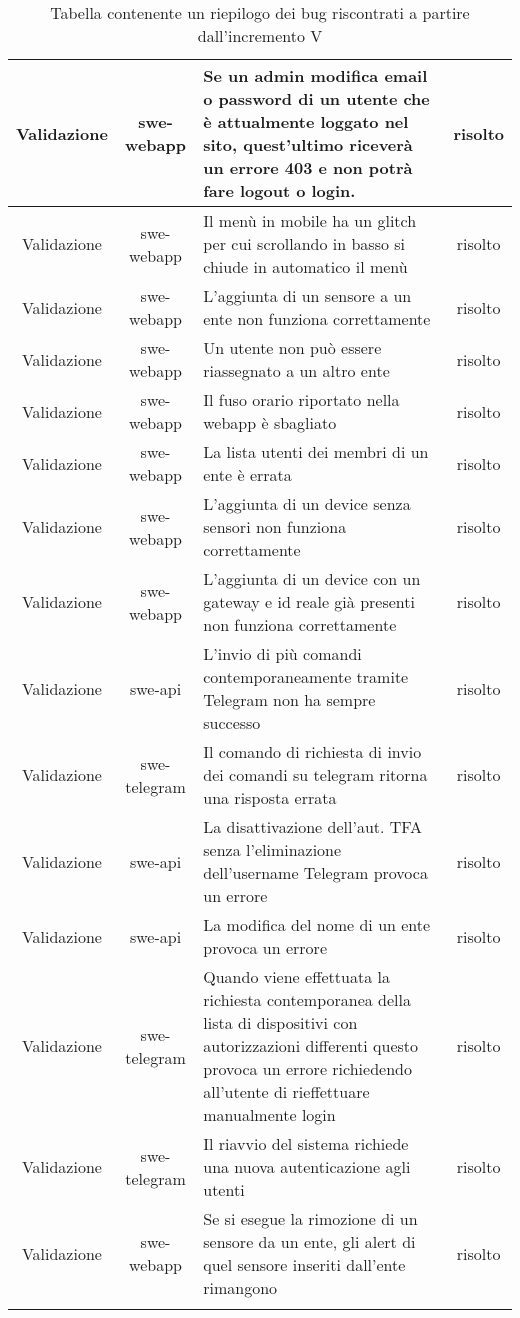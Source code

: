 \begin{center}
\begin{longtable}{|c|c|p{9.5cm}|c|}
    \hline
    Validazione & swe-webapp & Se un admin modifica email o password di un utente che è attualmente loggato nel sito, quest'ultimo riceverà un errore 403 e non potrà fare logout o login. & risolto \\
    \hline
    Validazione & swe-webapp & Il menù in mobile ha un glitch per cui scrollando in basso si chiude in automatico il menù  & risolto \\
    \hline
    Validazione & swe-webapp & L'aggiunta di un sensore a un ente non funziona correttamente & risolto \\
    \hline
    Validazione & swe-webapp & Un utente non può essere riassegnato a un altro ente & risolto \\
    \hline
    Validazione & swe-webapp & Il fuso orario riportato nella webapp è sbagliato & risolto \\
    \hline
    Validazione & swe-webapp & La lista utenti dei membri di un ente è errata & risolto \\
    \hline
    Validazione & swe-webapp & L'aggiunta di un device senza sensori non funziona correttamente & risolto \\
    \hline
    Validazione & swe-webapp & L'aggiunta di un device con un gateway e id reale già presenti non funziona correttamente & risolto \\
    \hline
    Validazione & swe-api & L'invio di più comandi contemporaneamente tramite Telegram non ha sempre successo & risolto \\
    \hline
    Validazione & swe-telegram & Il comando di richiesta di invio dei comandi su telegram ritorna una risposta errata & risolto \\
    \hline
    Validazione & swe-api & La disattivazione dell'aut. TFA senza l'eliminazione dell'username Telegram provoca un errore & risolto \\
    \hline
    Validazione & swe-api & La modifica del nome di un ente provoca un errore  & risolto \\
    \hline
    Validazione & swe-telegram & Quando viene effettuata la richiesta contemporanea della lista di dispositivi con autorizzazioni differenti questo provoca un errore richiedendo all'utente di rieffettuare manualmente login  & risolto \\
    \hline
    Validazione & swe-telegram & Il riavvio del sistema richiede una nuova autenticazione agli utenti & risolto \\
    \hline
    Validazione & swe-webapp & Se si esegue la rimozione di un sensore da un ente, gli alert di quel sensore inseriti dall'ente rimangono & risolto \\




		 \caption{Tabella contenente un riepilogo dei bug riscontrati a partire dall'incremento V}
		\end{longtable}
	\end{center}
		